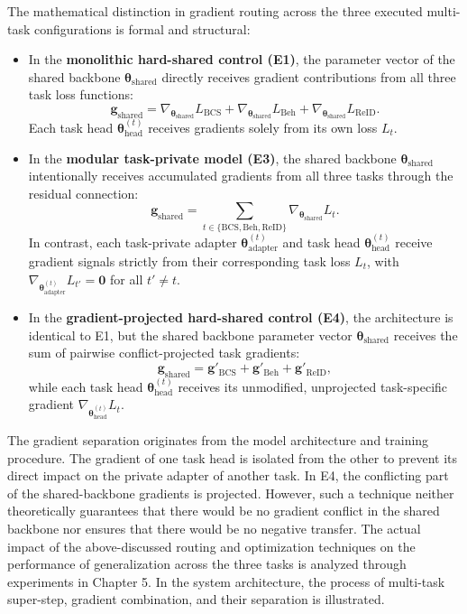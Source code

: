 The mathematical distinction in gradient routing across the three executed multi-task configurations is formal and structural:
\begin{itemize}
 \item In the \textbf{monolithic hard-shared control (E1)}, the parameter vector of the shared backbone $\boldsymbol{\theta}_{\mathrm{shared}}$ directly receives gradient contributions from all three task loss functions:
 \begin{equation}
  \mathbf{g}_{\mathrm{shared}} = \nabla_{\boldsymbol{\theta}_{\mathrm{shared}}} L_{\mathrm{BCS}} + \nabla_{\boldsymbol{\theta}_{\mathrm{shared}}} L_{\mathrm{Beh}} + \nabla_{\boldsymbol{\theta}_{\mathrm{shared}}} L_{\mathrm{ReID}}.
 \end{equation}
 Each task head $\boldsymbol{\theta}_{\mathrm{head}}^{(t)}$ receives gradients solely from its own loss $L_t$.
 \item In the \textbf{modular task-private model (E3)}, the shared backbone $\boldsymbol{\theta}_{\mathrm{shared}}$ intentionally receives accumulated gradients from all three tasks through the residual connection:
 \begin{equation}
  \mathbf{g}_{\mathrm{shared}} = \sum_{t \in \{\mathrm{BCS}, \mathrm{Beh}, \mathrm{ReID}\}} \nabla_{\boldsymbol{\theta}_{\mathrm{shared}}} L_t.
 \end{equation}
 In contrast, each task-private adapter $\boldsymbol{\theta}_{\mathrm{adapter}}^{(t)}$ and task head $\boldsymbol{\theta}_{\mathrm{head}}^{(t)}$ receive gradient signals strictly from their corresponding task loss $L_t$, with $\nabla_{\boldsymbol{\theta}_{\mathrm{adapter}}^{(t)}} L_{t'} = \mathbf{0}$ for all $t' \neq t$.
 \item In the \textbf{gradient-projected hard-shared control (E4)}, the architecture is identical to E1, but the shared backbone parameter vector $\boldsymbol{\theta}_{\mathrm{shared}}$ receives the sum of pairwise conflict-projected task gradients:
 \begin{equation}
  \mathbf{g}_{\mathrm{shared}} = \mathbf{g}'_{\mathrm{BCS}} + \mathbf{g}'_{\mathrm{Beh}} + \mathbf{g}'_{\mathrm{ReID}},
 \end{equation}
 while each task head $\boldsymbol{\theta}_{\mathrm{head}}^{(t)}$ receives its unmodified, unprojected task-specific gradient $\nabla_{\boldsymbol{\theta}_{\mathrm{head}}^{(t)}} L_t$.
\end{itemize}

The gradient separation originates from the model architecture and training procedure. The gradient of one task head is isolated from the other to prevent its direct impact on the private adapter of another task. In E4, the conflicting part of the shared-backbone gradients is projected. However, such a technique neither theoretically guarantees that there would be no gradient conflict in the shared backbone nor ensures that there would be no negative transfer. The actual impact of the above-discussed routing and optimization techniques on the performance of generalization across the three tasks is analyzed through experiments in Chapter 5. In the system architecture, the process of multi-task super-step, gradient combination, and their separation is illustrated.

